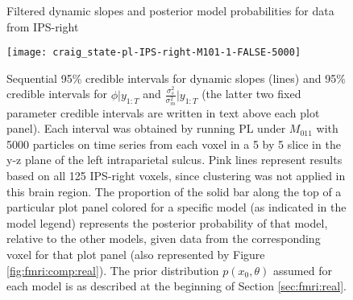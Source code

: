 

\begin{figure}
\ssp
\centering
\caption{Filtered dynamic slopes and posterior model probabilities for data from IPS-right} \label{fig:fmri:slopes:real:IPSr}
\texttt{[image: craig\_state-pl-IPS-right-M101-1-FALSE-5000]}
\caption*{Sequential 95\% credible intervals for dynamic slopes (lines) and 95\% credible intervals for $\phi|y_{1:T}$ and $\frac{\sigma^2_s}{\sigma^2_m}|y_{1:T}$ (the latter two fixed parameter credible intervals are written in text above each plot panel). Each interval was obtained by running PL under $M_{011}$ with 5000 particles on time series from each voxel in a 5 by 5 slice in the y-z plane of the left intraparietal sulcus. Pink lines represent results based on all 125 IPS-right voxels, since clustering was not applied in this brain region. The proportion of the solid bar along the top of a particular plot panel colored for a specific model (as indicated in the model legend) represents the posterior probability of that model, relative to the other models, given data from the corresponding voxel for that plot panel (also represented by Figure \ref{fig:fmri:comp:real}). The prior distribution $p(x_0,\theta)$ assumed for each model is as described at the beginning of Section \ref{sec:fmri:real}.}
\end{figure}

